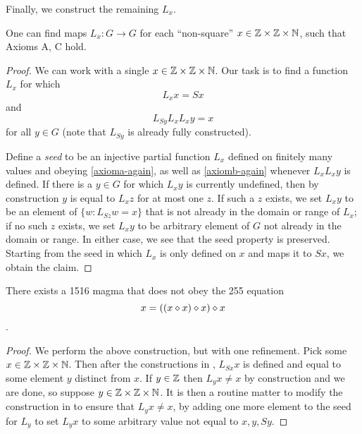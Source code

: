 Finally, we construct the remaining $L_x$.

\begin{proposition}\label{axiom-c} One can find maps $L_x: G \to G$ for each ``non-square'' $x \in \mathbb{Z} \times \mathbb{Z} \times \mathbb{N}$, such that Axioms A, C hold.
\end{proposition}

\begin{proof}  We can work with a single $x \in \mathbb{Z} \times \mathbb{Z} \times \mathbb{N}$.  Our task is to find a function $L_x$ for which
\begin{equation}\label{axioma-again}
   L_x x = Sx
\end{equation}
and
\begin{equation}\label{axiomb-again}
  L_{Sy} L_x L_x y = x
\end{equation}
for all $y \in G$ (note that $L_{Sy}$ is already fully constructed).

Define a \emph{seed} to be an injective partial function $L_x$ defined on finitely many values and obeying \eqref{axioma-again}, as well as \eqref{axiomb-again} whenever $L_x L_x y$ is defined.  If there is a $y \in G$ for which $L_x y$ is currently undefined, then by construction $y$ is equal to $L_x z$ for at most one $z$.  If such a $z$ exists, we set $L_x y$ to be an element of $\{ w: L_{Sz} w = x \}$ that is not already in the domain or range of $L_x$; if no such $z$ exists, we set $L_x y$ to be arbitrary element of $G$ not already in the domain or range.  In either case, we see that the seed property is preserved.  Starting from the seed in which $L_x$ is only defined on $x$ and maps it to $Sx$, we obtain the claim.
\end{proof}

\begin{corollary}\label{1516-no-255}  There exists a 1516 magma that does not obey the 255 equation $$x = ((x \diamond x) \diamond x) \diamond x$$.
\end{corollary}

\begin{proof}  We perform the above construction, but with one refinement.  Pick some $x \in \mathbb{Z} \times \mathbb{Z} \times \mathbb{N}$.  Then after the constructions in , $L_{Sx} x$ is defined and equal to some element $y$ distinct from $x$. If $y \in \mathbb{Z}$ then $L_y x \neq x$ by construction and we are done, so suppose $y \in \mathbb{Z} \times \mathbb{Z} \times \mathbb{N}$.  It is then a routine matter to modify the construction in  to ensure that $L_y x \neq x$, by adding one more element to the seed for $L_y$ to set $L_y x$ to some arbitrary value not equal to $x, y, Sy$.
\end{proof}
